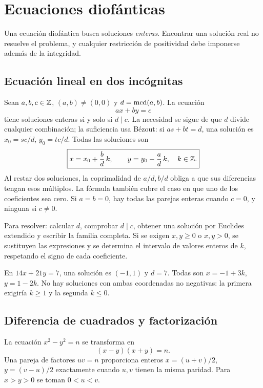 \chapter{Ecuaciones diofánticas}
\label{md:diofanticas}

Una ecuación diofántica busca soluciones \emph{enteras}.
Encontrar una solución real no resuelve el problema, y cualquier
restricción de positividad debe imponerse además de la integridad.

\section{Ecuación lineal en dos incógnitas}
\label{md:diofantica-lineal}

Sean $a,b,c\in\mathbb{Z}$, $(a,b)\ne(0,0)$ y $d=\operatorname{mcd}(a,b)$.
La ecuación
\[
 ax+by=c
\]
tiene soluciones enteras si y solo si $d\mid c$.
La necesidad se sigue de que $d$ divide cualquier combinación;
la suficiencia usa Bézout: si $as+bt=d$, una solución es
$x_0=sc/d$, $y_0=tc/d$.
Todas las soluciones son
\[
 \boxed{x=x_0+\frac bd\,k,\qquad y=y_0-\frac ad\,k,
 \quad k\in\mathbb{Z}.}
\]
Al restar dos soluciones, la coprimalidad de $a/d,b/d$ obliga a que
sus diferencias tengan esos múltiplos. La fórmula también cubre
el caso en que uno de los coeficientes sea cero.
Si $a=b=0$, hay todas las parejas enteras cuando $c=0$, y ninguna si $c\ne0$.

Para resolver: calcular $d$, comprobar $d\mid c$, obtener una solución
por Euclides extendido y escribir la familia completa. Si se exigen
$x,y\ge0$ o $x,y>0$, se sustituyen las expresiones y se determina
el intervalo de valores enteros de $k$, respetando el signo de cada coeficiente.

\begin{ejemplo}
En $14x+21y=7$, una solución es $(-1,1)$ y $d=7$.
Todas son $x=-1+3k$, $y=1-2k$.
No hay soluciones con ambas coordenadas no negativas: la primera
exigiría $k\ge1$ y la segunda $k\le0$.
\end{ejemplo}

\section{Diferencia de cuadrados y factorización}

La ecuación $x^2-y^2=n$ se transforma en
\[
 (x-y)(x+y)=n.
\]
Una pareja de factores $uv=n$ proporciona enteros
$x=(u+v)/2$, $y=(v-u)/2$ exactamente cuando $u,v$ tienen la misma
paridad. Para $x>y>0$ se toman $0<u<v$.

